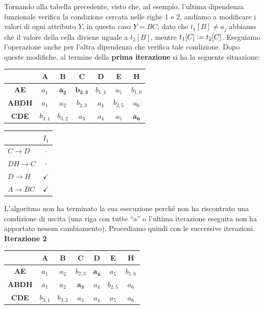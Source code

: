 \begin{exmp}
 Tornando alla tabella precedente, visto che, ad esempio, l'ultima dipendenza funzionale verifica la condizione cercata nelle righe 1 e 2,
 andiamo a modificare i valori di ogni attributo $Y$, in questo caso $Y= BC$; dato che $t_1[B]\not= a_j$ abbiamo che il valore
 della cella diviene uguale a $t_2[B]$, mentre $t_1[C]\vcentcolon= t_2[C]$. Eseguiamo l'operazione anche per l'altra dipendenza che 
 verifica tale condizione. Dopo queste modifiche, al termine della \textbf{prima 
 iterazione} si ha la seguente situazione:
 \begin{multicols}{2}
   \begin{center}
  \begin{tabular}{c|c|c|c|c|c|c}
    & \textbf{A} & \textbf{B} &\textbf{C}&\textbf{D}&\textbf{E}&\textbf{H}\\
   \hline
   \textbf{AE} & $a_1$ & $\mathbf{a_2}$ & $\mathbf{b_{2,3}}$ & $b_{1,4}$ & $a_5$ & $b_{1,6}$\\
   \hline
   \textbf{ABDH}& $a_1$ & $a_2$ & $b_{2,3}$ & $a_4$ & $b_{2,5}$ & $a_6$\\
   \hline
   \textbf{CDE} & $b_{3,1}$ & $b_{3,2}$ & $a_3$ & $a_4$ & $a_5$ & $\mathbf{a_6}$\\
  \end{tabular}
 \end{center}
 
  \begin{center}
  \begin{tabular}{l|c}
   & $I_1$\\
   \hline
   $C\rightarrow D$ & $\cdot$\\
   $DH\rightarrow C$& $\cdot$\\
   $D \rightarrow H$ & $\checkmark$\\
   $A \rightarrow BC$ & $\checkmark$\\
  \end{tabular}
 \end{center}
 \end{multicols}
L'algoritmo non ha terminato la sua esecuzione perché non ha riscontrato una condizione di uscita (una riga con tutte ``a'' o
l'ultima iterazione eseguita non ha apportato nessun cambiamento). Procediamo quindi con le successive iterazioni.\\

\textbf{Iterazione 2}
 \begin{multicols}{2}
   \begin{center}
  \begin{tabular}{c|c|c|c|c|c|c}
    & \textbf{A} & \textbf{B} &\textbf{C}&\textbf{D}&\textbf{E}&\textbf{H}\\
   \hline
   \textbf{AE} & $a_1$ & $a_2$ & $b_{2,3}$ & $\mathbf{a_4}$ & $a_5$ & $b_{1,6}$\\
   \hline
   \textbf{ABDH}& $a_1$ & $a_2$ & $\mathbf{a_3}$ & $a_4$ & $b_{2,5}$ & $a_6$\\
   \hline
   \textbf{CDE} & $b_{3,1}$ & $b_{3,2}$ & $a_3$ & $a_4$ & $a_5$ & $a_6$
  \end{tabular}
 \end{center}
 

\end{multicols}
\end{exmp}
